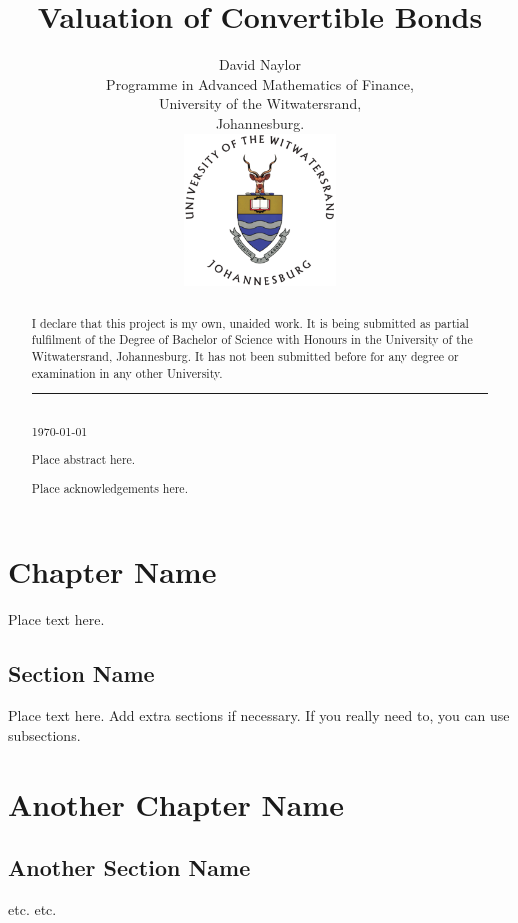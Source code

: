 \documentclass[a4paper,11pt,oneside]{report}
\title{Valuation of Convertible Bonds}
\author{David Naylor\\[2cm]
Programme in Advanced Mathematics of Finance,\\
University of the Witwatersrand,\\
Johannesburg.\\[2cm]
\includegraphics[width=4cm]{../common/WitsColourLogo}\\[2cm]
}
\newcommand{\setlinespacing}[1]
           {\renewcommand{\baselinestretch}{#1}\small\normalsize}
\theoremstyle{plain}
\theoremstyle{definition}
\begin{document}
\maketitle \setlinespacing{1.20}


\def\abstractname{\Huge Declaration}
\begin{abstract}
I declare that this project is my own, unaided work. It is being submitted as partial fulfilment of the Degree of Bachelor of Science with Honours in the University of the Witwatersrand, Johannesburg. It has not been submitted before for any degree or examination in any other University.\\[3cm]
\noindent\rule{5cm}{0.5pt}\\[1cm]
\noindent \today
\end{abstract}


\def\abstractname{\Huge Abstract}
\begin{abstract}
Place abstract here.
\end{abstract}


\def\abstractname{\Huge Acknowledgements}
\begin{abstract}
Place acknowledgements here.
\end{abstract}


\setlinespacing{1}
\tableofcontents
\listoffigures
\listoftables
\clearpage
\setlinespacing{1.20}
\setcounter{page}{1}


\chapter{Chapter Name}

Place text here.

\section{Section Name}

Place text here. Add extra sections if necessary. If you really need to, you can use subsections.

\chapter{Another Chapter Name}


\section{Another Section Name}

etc. etc.


\clearpage
\setlinespacing{1}


\end{document}
